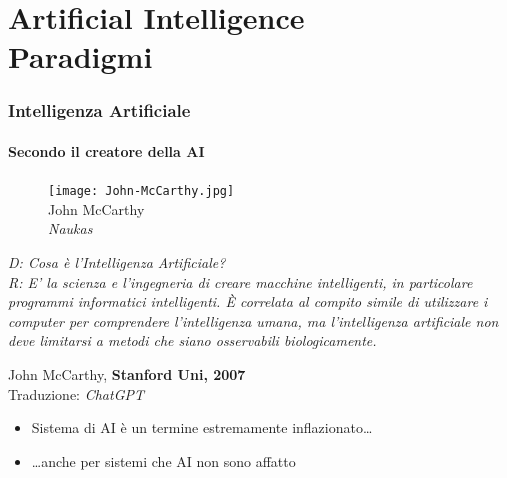 \section{Artificial Intelligence\\{\small Paradigmi}} %
\label{sec:ai_paradigms}
%
\begin{frame}[t,fragile] \frametitle{Intelligenza Artificiale}
{\scriptsize
	\onslide<1->
		\framesubtitle{Secondo il creatore della AI}
		\vspace*{3pt}
		\begin{minipage}[t]{\textwidth}
			\begin{minipage}[t]{0.45\textwidth}
				\centering
				\begin{figure}[ht]
					\texttt{[image: John-McCarthy.jpg]}
					{\tiny\\John McCarthy\\\vspace*{-1pt}\textit{\textcopyright Naukas}}
				\end{figure}
			\end{minipage}
		    \begin{minipage}[t]{0.5\textwidth}
				\renewcommand{\epigraphsize}{\small}
				\setlength{\afterepigraphskip}{0pt}
				\setlength{\beforeepigraphskip}{5pt}
				\setlength{\epigraphwidth}{\textwidth}
				\epigraph{
					\textit{\alert{D:} Cosa è l'Intelligenza Artificiale?\\
					\alert{R:} E' la scienza e l'ingegneria di creare macchine intelligenti, in particolare programmi informatici intelligenti. È correlata al compito simile di utilizzare i computer per comprendere l'intelligenza umana, ma l'intelligenza artificiale non deve limitarsi a metodi che siano osservabili biologicamente.}}{John McCarthy, \textbf{Stanford Uni, 2007}\\Traduzione: \textit{\textcopyright ChatGPT}}
			\end{minipage}
		\end{minipage}
}
	\begin{itemize}[leftmargin=10pt,align=right]
		\item[\alert{\faArrowCircleRight}] Sistema di AI è un termine estremamente inflazionato\ldots 
		\onslide<3->\item[\alert{\faArrowCircleRight}] \ldots anche per sistemi che AI non sono affatto
	\end{itemize}
\end{frame}
%
